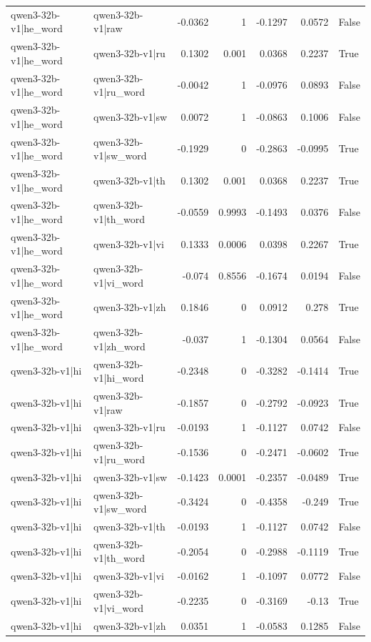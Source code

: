 \begin{table}
\begin{tabular}{l l r r r r l}
qwen3-32b-v1|he_word & qwen3-32b-v1|raw & -0.0362 & 1 & -0.1297 & 0.0572 & False \\
qwen3-32b-v1|he_word & qwen3-32b-v1|ru & 0.1302 & 0.001 & 0.0368 & 0.2237 & True \\
qwen3-32b-v1|he_word & qwen3-32b-v1|ru_word & -0.0042 & 1 & -0.0976 & 0.0893 & False \\
qwen3-32b-v1|he_word & qwen3-32b-v1|sw & 0.0072 & 1 & -0.0863 & 0.1006 & False \\
qwen3-32b-v1|he_word & qwen3-32b-v1|sw_word & -0.1929 & 0 & -0.2863 & -0.0995 & True \\
qwen3-32b-v1|he_word & qwen3-32b-v1|th & 0.1302 & 0.001 & 0.0368 & 0.2237 & True \\
qwen3-32b-v1|he_word & qwen3-32b-v1|th_word & -0.0559 & 0.9993 & -0.1493 & 0.0376 & False \\
qwen3-32b-v1|he_word & qwen3-32b-v1|vi & 0.1333 & 0.0006 & 0.0398 & 0.2267 & True \\
qwen3-32b-v1|he_word & qwen3-32b-v1|vi_word & -0.074 & 0.8556 & -0.1674 & 0.0194 & False \\
qwen3-32b-v1|he_word & qwen3-32b-v1|zh & 0.1846 & 0 & 0.0912 & 0.278 & True \\
qwen3-32b-v1|he_word & qwen3-32b-v1|zh_word & -0.037 & 1 & -0.1304 & 0.0564 & False \\
qwen3-32b-v1|hi & qwen3-32b-v1|hi_word & -0.2348 & 0 & -0.3282 & -0.1414 & True \\
qwen3-32b-v1|hi & qwen3-32b-v1|raw & -0.1857 & 0 & -0.2792 & -0.0923 & True \\
qwen3-32b-v1|hi & qwen3-32b-v1|ru & -0.0193 & 1 & -0.1127 & 0.0742 & False \\
qwen3-32b-v1|hi & qwen3-32b-v1|ru_word & -0.1536 & 0 & -0.2471 & -0.0602 & True \\
qwen3-32b-v1|hi & qwen3-32b-v1|sw & -0.1423 & 0.0001 & -0.2357 & -0.0489 & True \\
qwen3-32b-v1|hi & qwen3-32b-v1|sw_word & -0.3424 & 0 & -0.4358 & -0.249 & True \\
qwen3-32b-v1|hi & qwen3-32b-v1|th & -0.0193 & 1 & -0.1127 & 0.0742 & False \\
qwen3-32b-v1|hi & qwen3-32b-v1|th_word & -0.2054 & 0 & -0.2988 & -0.1119 & True \\
qwen3-32b-v1|hi & qwen3-32b-v1|vi & -0.0162 & 1 & -0.1097 & 0.0772 & False \\
qwen3-32b-v1|hi & qwen3-32b-v1|vi_word & -0.2235 & 0 & -0.3169 & -0.13 & True \\
qwen3-32b-v1|hi & qwen3-32b-v1|zh & 0.0351 & 1 & -0.0583 & 0.1285 & False \\

\end{tabular}
\end{table}
